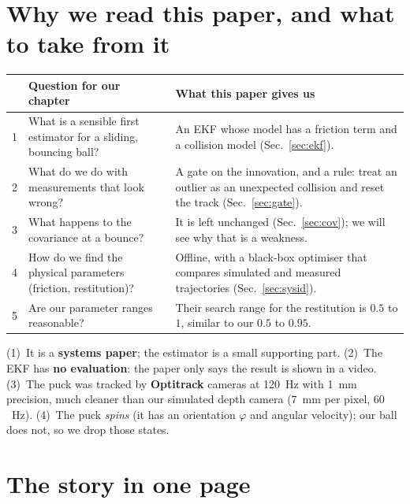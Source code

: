 \documentclass[11pt,a4paper]{article}
\begin{document}
\tableofcontents
\newpage

\section{Why we read this paper, and what to take from it}

\begin{center}
\begin{tabularx}{\textwidth}{@{}c p{4.4cm} X@{}}
\toprule
 & Question for our chapter & What this paper gives us \\
\midrule
1 & What is a sensible first estimator for a sliding, bouncing ball? & An EKF whose model has a friction term and a collision model (Sec.~\ref{sec:ekf}). \\
2 & What do we do with measurements that look wrong? & A gate on the innovation, and a rule: treat an outlier as an unexpected collision and reset the track (Sec.~\ref{sec:gate}). \\
3 & What happens to the covariance at a bounce? & It is left unchanged (Sec.~\ref{sec:cov}); we will see why that is a weakness. \\
4 & How do we find the physical parameters (friction, restitution)? & Offline, with a black-box optimiser that compares simulated and measured trajectories (Sec.~\ref{sec:sysid}). \\
5 & Are our parameter ranges reasonable? & Their search range for the restitution is $0.5$ to $1$, similar to our $0.5$ to $0.95$. \\
\bottomrule
\end{tabularx}
\end{center}

\begin{warn}
(1)~It is a \textbf{systems paper}; the estimator is a small supporting part. (2)~The EKF has
\textbf{no evaluation}: the paper only says the result is shown in a video. (3)~The puck was
tracked by \textbf{Optitrack} cameras at 120~Hz with 1~mm precision, much cleaner than our
simulated depth camera ($7$~mm per pixel, $60$~Hz). (4)~The puck \emph{spins} (it has an
orientation $\varphi$ and angular velocity); our ball does not, so we drop those states.
\end{warn}

\section{The story in one page}
\end{document}
